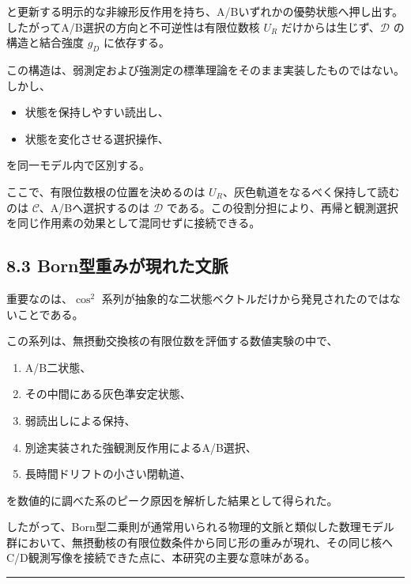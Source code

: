 \documentclass[
  a4paper,
  10pt]{article}
\providecommand{\tightlist}{%
  \setlength{\itemsep}{0pt}\setlength{\parskip}{0pt}}
\begin{document}
と更新する明示的な非線形反作用を持ち、A/Bいずれかの優勢状態へ押し出す。したがってA/B選択の方向と不可逆性は有限位数核
\(U_R\) だけからは生じず、\(\mathcal D\) の構造と結合強度 \(g_D\)
に依存する。

この構造は、弱測定および強測定の標準理論をそのまま実装したものではない。しかし、

\begin{itemize}
\tightlist
\item
  状態を保持しやすい読出し、
\item
  状態を変化させる選択操作、
\end{itemize}

を同一モデル内で区別する。

ここで、有限位数根の位置を決めるのは
\(U_R\)、灰色軌道をなるべく保持して読むのは
\(\mathcal C\)、A/Bへ選択するのは \(\mathcal D\)
である。この役割分担により、再帰と観測選択を同じ作用素の効果として混同せずに接続できる。

\subsection{8.3
Born型重みが現れた文脈}\label{83-bornux578bux91cdux307fux304cux73feux308cux305fux6587ux8108}

重要なのは、\(\cos^2\)
系列が抽象的な二状態ベクトルだけから発見されたのではないことである。

この系列は、無摂動交換核の有限位数を評価する数値実験の中で、

\begin{enumerate}
\def\labelenumi{\arabic{enumi}.}
\tightlist
\item
  A/B二状態、
\item
  その中間にある灰色準安定状態、
\item
  弱読出しによる保持、
\item
  別途実装された強観測反作用によるA/B選択、
\item
  長時間ドリフトの小さい閉軌道、
\end{enumerate}

を数値的に調べた系のピーク原因を解析した結果として得られた。

したがって、Born型二乗則が通常用いられる物理的文脈と類似した数理モデル群において、無摂動核の有限位数条件から同じ形の重みが現れ、その同じ核へC/D観測写像を接続できた点に、本研究の主要な意味がある。

\begin{center}\rule{0.5\linewidth}{0.5pt}\end{center}
\end{document}
